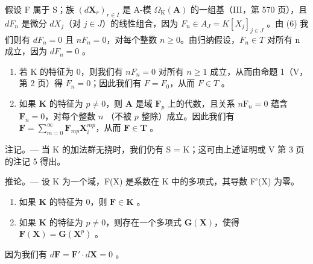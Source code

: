假设 F 属于 S；族 \((d\mathbf{X}_{r})_{r\in I}\) 是 A-模 \(\Omega_{\mathrm{K}}(\mathbf{A})\) 的一组基（III，第 570 页），且 \(dF_{n}\) 是微分 \(dX_{j}\)（对 \(j\in J\)）的线性组合，因为 \(F_{n}\in A_{J}=K[X_{j}]_{j\in J}\) 。由 (6) 我们则有 \(dF_{n}=0\) 且 \(nF_{n}=0\)，对每个整数 \(n\geqslant0\)。由归纳假设，\(F_{n}\in T\) 对所有 n 成立，因为 \(dF_{n}=0\) 。

\begin{enumerate}
\def\labelenumi{\alph{enumi})}
\item
  若 K 的特征为 0，则我们有 \(nF_{n} = 0\) 对所有 \(n \geqslant 1\) 成立，从而由命题 1（V，第 2 页）得 \(F_{n} = 0\)；因此我们有 \(F = F_{0}\)，从而 \(F \in T\) 。
\item
  如果 \(\mathbf{K}\) 的特征为 \(p \neq 0\)，则 \(\mathbf{A}\) 是域 \(\mathbf{F}_p\) 上的代数，且关系 \(n\mathrm{F}_n = 0\) 蕴含 \(\mathbf{F}_n = 0\)，对每个整数 \(n\) （不被 \(p\) 整除）成立。因此我们有 \(\mathbf{F} = \sum_{m=0}^{\infty} \mathbf{F}_{mp} \mathbf{X}_i^{mp}\)，从而 \(\mathbf{F} \in \mathbf{T}\) 。
\end{enumerate}

注记。--- 当 K 的加法群无挠时，我们仍有 S = K；这可由上述证明或 V 第 3 页的注记 5 得出。

推论。--- 设 K 为一个域，F(X) 是系数在 K 中的多项式，其导数 F'(X) 为零。

\begin{enumerate}
\def\labelenumi{\alph{enumi})}
\item
  如果 \(\mathbf{K}\) 的特征为 0，则 \(\mathbf{F} \in \mathbf{K}\) 。
\item
  如果 \(\mathbf{K}\) 的特征为 \(p \neq 0\)，则存在一个多项式 \(\mathbf{G}(\mathbf{X})\)，使得 \(\mathbf{F}(\mathbf{X}) = \mathbf{G}(\mathbf{X}^p)\) 。
\end{enumerate}

因为我们有 \(d\mathbf{F} = \mathbf{F}' \cdot d\mathbf{X} = 0\) 。


